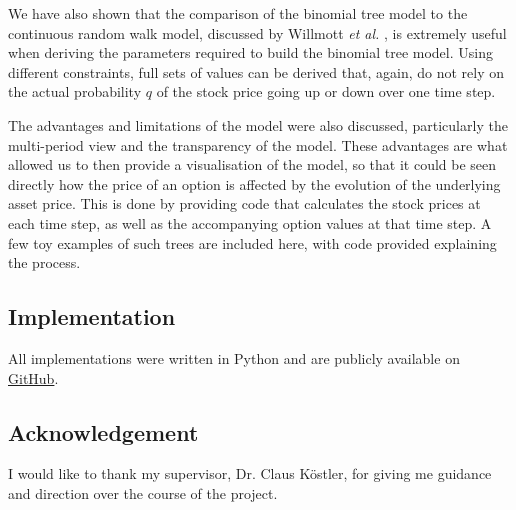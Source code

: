 \documentclass[letterpaper,12pt]{article}
\theoremstyle{plain}
\numberwithin{equation}{section}
\begin{document}
We have also shown that the comparison of the binomial tree model to the continuous random walk model, discussed by Willmott {\em et al.} \cite{MFD}, is extremely useful when deriving the parameters required to build the binomial tree model. Using different constraints, full sets of values can be derived that, again, do not rely on the actual probability $q$ of the stock price going up or down over one time step.

The advantages and limitations of the model were also discussed, particularly the multi-period view and the transparency of the model. These advantages are what allowed us to then provide a visualisation of the model, so that it could be seen directly how the price of an option is affected by the evolution of the underlying asset price. This is done by providing code that calculates the stock prices at each time step, as well as the accompanying option values at that time step. A few toy examples of such trees are included here, with code provided explaining the process.






\subsection*{Implementation} 

\noindent All implementations were written in Python and are publicly available on \href{https://github.com/LevUdaltsov/AmericanOptionPricing.git}{GitHub}.

\subsection*{Acknowledgement}
I would like to thank my supervisor, Dr. Claus Köstler, for giving me guidance and direction over the course of the project. \\
\end{document}
